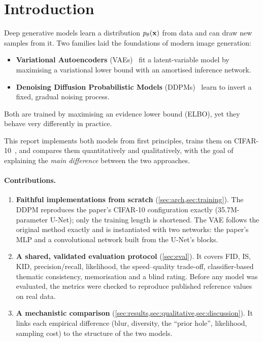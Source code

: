 \section{Introduction}
\label{sec:intro}

Deep generative models learn a distribution $p_\theta(\mathbf{x})$ from data and can draw new samples from it. Two
families laid the foundations of modern image generation:
\begin{itemize}
  \item \textbf{Variational Autoencoders} (VAEs)~\citep{kingma2014vae} fit a latent-variable model by maximising
        a variational lower bound with an amortised inference network.
  \item \textbf{Denoising Diffusion Probabilistic Models} (DDPMs)~\citep{sohl2015deep,ho2020ddpm} learn to invert
        a fixed, gradual noising process.
\end{itemize}
Both are trained by maximising an evidence lower bound (ELBO), yet they behave very differently in practice.

This report implements both models from first principles, trains them on CIFAR-10~\citep{krizhevsky2009cifar},
and compares them quantitatively and qualitatively, with the goal of explaining the \emph{main difference}
between the two approaches.

\paragraph{Contributions.}
\begin{enumerate}
  \item \textbf{Faithful implementations from scratch} (\cref{sec:arch,sec:training}). The DDPM reproduces the
        paper's CIFAR-10 configuration exactly (35.7M-parameter U-Net); only the training length is shortened.
        The VAE follows the original method exactly and is instantiated with two networks: the paper's MLP and a
        convolutional network built from the U-Net's blocks.
  \item \textbf{A shared, validated evaluation protocol} (\cref{sec:eval}). It covers FID, IS, KID,
        precision/recall, likelihood, the speed--quality trade-off, classifier-based thematic consistency,
        memorisation and a blind rating. Before any model was evaluated, the metrics were checked to reproduce
        published reference values on real data.
  \item \textbf{A mechanistic comparison} (\cref{sec:results,sec:qualitative,sec:discussion}). It links each
        empirical difference (blur, diversity, the ``prior hole'', likelihood, sampling cost) to the structure of
        the two models.
\end{enumerate}

